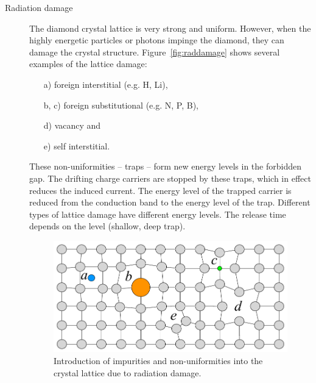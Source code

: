 \begin{description}
\item[Radiation damage]
The diamond crystal lattice is very strong and uniform. However, when the highly energetic particles or photons impinge the diamond, they can damage the crystal structure. Figure~\ref{fig:raddamage} shows several examples of the lattice damage:
\begin{enumerate}
\item[a)]foreign interstitial (e.g. H, Li),
\item[b, c)]foreign substitutional (e.g. N, P, B),
\item[d)]vacancy and
\item[e)]self interstitial.
\end{enumerate} 
These non-uniformities -- traps -- form new energy levels in the forbidden gap. The drifting charge carriers are stopped by these traps, which in effect reduces the induced current. The energy level of the trapped carrier is reduced from the conduction band to the energy level of the trap. Different types of lattice damage have different energy levels. The release time depends on the level (shallow, deep trap).

\begin{figure}[!t]
\begin{center}
\includegraphics[width=0.8\linewidth]{02_pulse_formation/pics/plots/raddamage}
\caption{Introduction of impurities and non-uniformities into the crystal lattice due to radiation damage.}
\label{fig:spcchg}
\end{center}
\end{figure}

\end{description}













